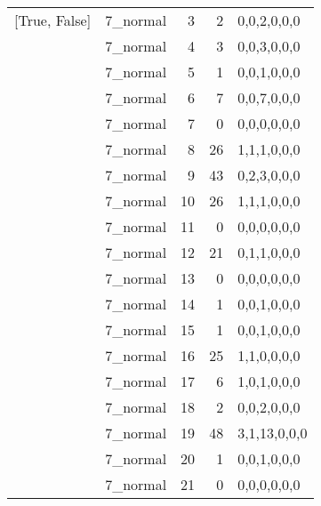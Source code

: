 \begin{tabular}{llrrl}
 [True, False]   & 7\_normal            &             3 &                     2 & 0,0,2,0,0,0   \\
 [True, False]   & 7\_normal            &             4 &                     3 & 0,0,3,0,0,0   \\
 [True, False]   & 7\_normal            &             5 &                     1 & 0,0,1,0,0,0   \\
 [True, False]   & 7\_normal            &             6 &                     7 & 0,0,7,0,0,0   \\
 [True, False]   & 7\_normal            &             7 &                     0 & 0,0,0,0,0,0   \\
 [True, False]   & 7\_normal            &             8 &                    26 & 1,1,1,0,0,0   \\
 [True, False]   & 7\_normal            &             9 &                    43 & 0,2,3,0,0,0   \\
 [True, False]   & 7\_normal            &            10 &                    26 & 1,1,1,0,0,0   \\
 [True, False]   & 7\_normal            &            11 &                     0 & 0,0,0,0,0,0   \\
 [True, False]   & 7\_normal            &            12 &                    21 & 0,1,1,0,0,0   \\
 [True, False]   & 7\_normal            &            13 &                     0 & 0,0,0,0,0,0   \\
 [True, False]   & 7\_normal            &            14 &                     1 & 0,0,1,0,0,0   \\
 [True, False]   & 7\_normal            &            15 &                     1 & 0,0,1,0,0,0   \\
 [True, False]   & 7\_normal            &            16 &                    25 & 1,1,0,0,0,0   \\
 [True, False]   & 7\_normal            &            17 &                     6 & 1,0,1,0,0,0   \\
 [True, False]   & 7\_normal            &            18 &                     2 & 0,0,2,0,0,0   \\
 [True, False]   & 7\_normal            &            19 &                    48 & 3,1,13,0,0,0  \\
 [True, False]   & 7\_normal            &            20 &                     1 & 0,0,1,0,0,0   \\
 [True, False]   & 7\_normal            &            21 &                     0 & 0,0,0,0,0,0   \\

\end{tabular}
